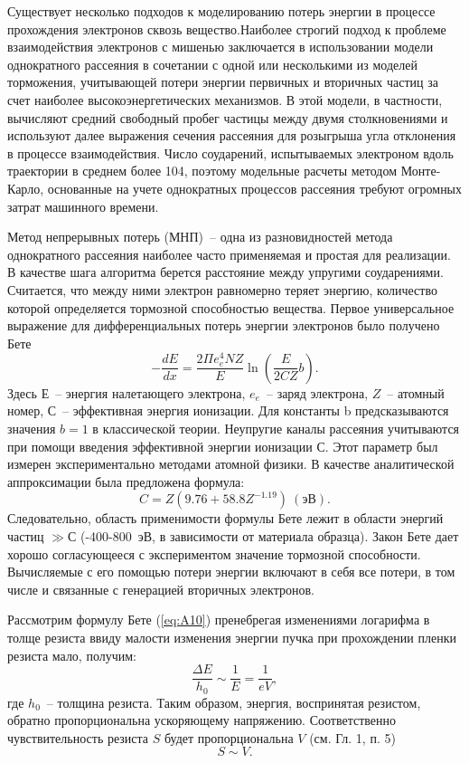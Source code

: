 Существует несколько подходов к моделированию потерь энергии в процессе прохождения электронов сквозь вещество.Наиболее строгий подход к проблеме взаимодействия электронов с мишенью заключается в использовании модели однократного рассеяния	в сочетании с одной или несколькими из моделей торможения, учитывающей потери энергии первичных и вторичных частиц за счет наиболее высокоэнергетических механизмов.
В этой модели, в частности, вычисляют средний свободный пробег частицы между двумя столкновениями и используют далее выражения сечения рассеяния для розыгрыша угла отклонения в процессе взаимодействия. Число соударений, испытываемых электроном вдоль траектории в среднем более 104, поэтому модельные расчеты методом Монте-Карло, основанные на учете однократных процессов рассеяния требуют огромных затрат машинного времени.

Метод непрерывных потерь (МНП)~-- одна из разновидностей метода однократного рассеяния наиболее часто применяемая и простая для реализации. В качестве шага алгоритма берется расстояние между упругими соударениями. Считается, что между ними электрон равномерно теряет энергию, количество которой определяется тормозной способностью вещества.
Первое универсальное выражение для дифференциальных потерь энергии электронов было получено Бете
\begin{equation}
-\frac{dE}{dx}=\frac{2\Pi e_e^4 NZ}{E} \ln \left(\frac{E}{2CZ}b\right).
\label{eq:A10}
\end{equation}
Здесь $Е$~-- энергия налетающего электрона, $e_e$~-- заряд электрона, $Z$~-- атомный номер, $С$~-- эффективная энергия ионизации. Для константы b предсказываются значения $b = 1$ в классической теории. Неупругие каналы рассеяния учитываются при помощи введения эффективной энергии ионизации С. Этот параметр был измерен экспериментально методами атомной физики. В качестве аналитической аппроксимации была предложена формула:
\begin{equation}
C=Z\left(9.76+58.8Z^{-1.19}\right)~(\text{эВ}).
\label{eq:A11}
\end{equation}
Следовательно, область применимости формулы Бете лежит в области энергий частиц $\gg С$  (-400-800~эВ, в зависимости от материала образца). Закон Бете дает хорошо согласующееся с экспериментом значение тормозной способности. Вычисляемые с его помощью потери энергии включают в себя все потери, в том числе и связанные с генерацией вторичных электронов.

Рассмотрим формулу Бете (\ref{eq:A10}) пренебрегая изменениями логарифма в толще резиста ввиду малости изменения энергии пучка при прохождении пленки резиста мало, получим:
\begin{equation}
    \frac{\Delta E}{h_0} \sim \frac{1}{E} = \frac{1}{eV},
\end{equation}
где $h_0$~-- толщина резиста. Таким образом, энергия, воспринятая резистом, обратно пропорциональна ускоряющему напряжению. Соответственно чувствительность резиста $S$ будет пропорциональна $V$ (см. Гл. 1, п. 5)
\begin{equation}
    S \sim V.
\end{equation}

